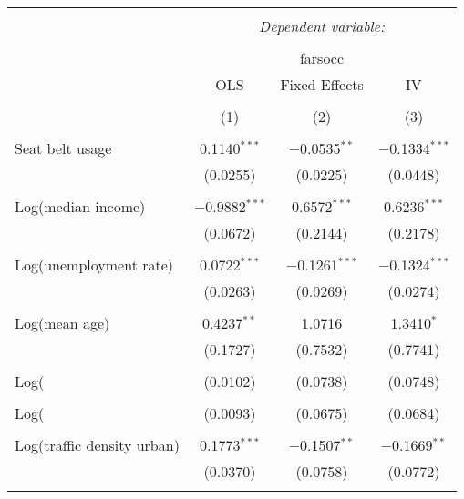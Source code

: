 
\begin{table}[!htbp] \centering 
  \caption{} 
  \label{} 
\begin{tabular}{@{\extracolsep{5pt}}lccc} 
\\[-1.8ex]\hline 
\hline \\[-1.8ex] 
 & \multicolumn{3}{c}{\textit{Dependent variable:}} \\ 
\cline{2-4} 
\\[-1.8ex] & \multicolumn{3}{c}{farsocc} \\ 
 & OLS & Fixed Effects & IV \\ 
\\[-1.8ex] & (1) & (2) & (3)\\ 
\hline \\[-1.8ex] 
 Seat belt usage & 0.1140$^{***}$ & $-$0.0535$^{**}$ & $-$0.1334$^{***}$ \\ 
  & (0.0255) & (0.0225) & (0.0448) \\ 
  & & & \\ 
 Log(median income) & $-$0.9882$^{***}$ & 0.6572$^{***}$ & 0.6236$^{***}$ \\ 
  & (0.0672) & (0.2144) & (0.2178) \\ 
  & & & \\ 
 Log(unemployment rate) & 0.0722$^{***}$ & $-$0.1261$^{***}$ & $-$0.1324$^{***}$ \\ 
  & (0.0263) & (0.0269) & (0.0274) \\ 
  & & & \\ 
 Log(mean age) & 0.4237$^{**}$ & 1.0716 & 1.3410$^{*}$ \\ 
  & (0.1727) & (0.7532) & (0.7741) \\ 
  & & & \\ 
 Log(%
  & (0.0102) & (0.0738) & (0.0748) \\ 
  & & & \\ 
 Log(%
  & (0.0093) & (0.0675) & (0.0684) \\ 
  & & & \\ 
 Log(traffic density urban) & 0.1773$^{***}$ & $-$0.1507$^{**}$ & $-$0.1669$^{**}$ \\ 
  & (0.0370) & (0.0758) & (0.0772) \\ 
  & & & \\ 

\end{tabular}
\end{table}
